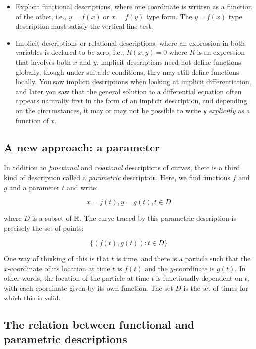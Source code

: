 \documentclass[10pt]{amsart}
\begin{document}
\begin{itemize}
\item Explicit functional descriptions, where one coordinate is
  written as a function of the other, i.e., $y = f(x)$ or $x = f(y)$
  type form. The $y = f(x)$ type description must satisfy the vertical
  line test.
\item Implicit descriptions or relational descriptions, where an
  expression in both variables is declared to be zero, i.e., $R(x,y) =
  0$ where $R$ is an expression that involves both $x$ and
  $y$. Implicit descriptions need not define functions globally,
  though under suitable conditions, they may still define functions
  locally. You saw implicit descriptions when looking at implicit
  differentiation, and later you saw that the general solution to a
  differential equation often appears naturally first in the form of
  an implicit description, and depending on the circumstances, it may
  or may not be possible to write $y$ {\em explicitly} as a function
  of $x$.
\end{itemize}

\subsection{A new approach: a parameter}

In addition to {\em functional} and {\em relational} descriptions of
curves, there is a third kind of description called a {\em parametric}
description. Here, we find functions $f$ and $g$ and a parameter $t$ and write:

$$x = f(t), y = g(t), t \in D$$

where $D$ is a subset of $\mathbb{R}$. The curve traced by this parametric description is precisely the set of points:

$$\{ (f(t),g(t)) : t \in D \}$$

One way of thinking of this is that $t$ is time, and there is a
particle such that the $x$-coordinate of its location at time $t$ is
$f(t)$ and the $y$-coordinate is $g(t)$. In other words, the location
of the particle at time $t$ is functionally dependent on $t$, with
each coordinate given by its own function. The set $D$ is the set of
times for which this is valid.

\subsection{The relation between functional and parametric descriptions}
\end{document}
